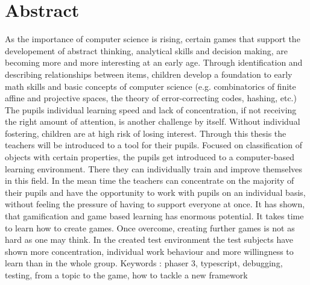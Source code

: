 
\chapter*{Abstract}

As the importance of computer science is rising, certain games that support the
developement of abstract thinking, analytical skills and decision making, are
becoming more and more interesting at an early age. Through identification and
describing relationships between items, children develop a foundation to early
math skills and basic concepts of computer science (e.g. combinatorics of finite
affine and projective spaces, the theory of error-correcting codes, hashing, etc.)
The pupils individual learning speed and lack of concentration, if
not receiving the right amount of attention, is another challenge by itself.
Without individual fostering, children are at high risk of losing interest.
Through this thesis the teachers will be introduced to a tool for their pupils.
Focused on classification of objects with certain properties, the pupils get
introduced to a computer-based learning environment. There they can individually
train and improve themselves in this field. In the mean time the teachers can
concentrate on the majority of their pupils and have the opportunity to work with
pupils on an individual basis, without feeling the pressure of having to support
everyone at once.
It has shown, that gamification and game based learning has enormous potential.
It takes time to learn how to create games. Once overcome, creating further games
is not as hard as one may think. In the created test environment the test subjects
have shown more concentration, individual work behaviour and more willingness to
learn than in the whole group.
Keywords : phaser 3, typescript, debugging, testing, from a topic to the game, how to tackle a new framework

